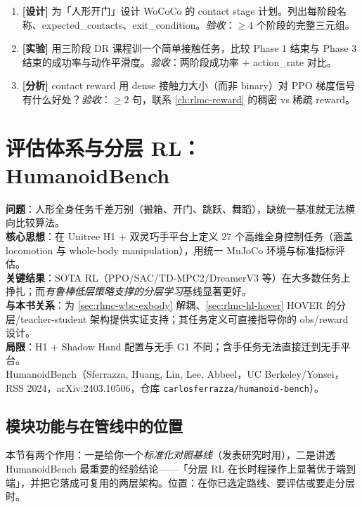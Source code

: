 \begin{practice}[本节动手]
\begin{enumerate}
  \item \textbf{[设计]} 为「人形开门」设计 WoCoCo 的 contact stage 计划。列出每阶段名称、expected\_contacts、exit\_condition。\emph{验收}：$\geq 4$ 个阶段的完整三元组。
  \item \textbf{[实验]} 用三阶段 DR 课程训一个简单接触任务，比较 Phase 1 结束与 Phase 3 结束的成功率与动作平滑度。\emph{验收}：两阶段成功率 $+$ action\_rate 对比。
  \item \textbf{[分析]} contact reward 用 dense 接触力大小（而非 binary）对 PPO 梯度信号有什么好处？\emph{验收}：$\geq 2$ 句，联系 \cref{ch:rlmc-reward} 的稠密 vs 稀疏 reward。
\end{enumerate}
\end{practice}

\section{评估体系与分层 RL：HumanoidBench}\label{sec:rlmc-wbc-bench}

\begin{paper}\label{paper:rlmc-wbc-bench}
\textbf{问题}：人形全身任务千差万别（搬箱、开门、跳跃、舞蹈），缺统一基准就无法横向比较算法。\\
\textbf{核心思想}：在 Unitree H1 $+$ 双灵巧手平台上定义 $27$ 个高维全身控制任务（涵盖 locomotion 与 whole-body manipulation），用统一 MuJoCo 环境与标准指标评估。\\
\textbf{关键结果}：SOTA RL（PPO/SAC/TD-MPC2/DreamerV3 等）在大多数任务上挣扎；而\emph{有鲁棒低层策略支撑的分层学习}基线显著更好。\\
\textbf{与本书关系}：为 \cref{sec:rlmc-wbc-exbody} 解耦、\cref{sec:rlmc-hl-hover} HOVER 的分层/teacher-student 架构提供实证支持；其任务定义可直接指导你的 obs/reward 设计。\\
\textbf{局限}：H1 $+$ Shadow Hand 配置与无手 G1 不同；含手任务无法直接迁到无手平台。\\
HumanoidBench（Sferrazza, Huang, Lin, Lee, Abbeel，UC Berkeley/Yonsei，RSS 2024，arXiv:2403.10506，仓库 \texttt{carlosferrazza/humanoid-bench}）\cite{sferrazza2024humanoidbench}。
\end{paper}

\subsection{模块功能与在管线中的位置}
本节有两个作用：一是给你一个\emph{标准化对照基线}（发表研究时用），二是讲透 HumanoidBench 最重要的经验结论——「分层 RL 在长时程操作上显著优于端到端」，并把它落成可复用的两层架构。位置：在你已选定路线、要评估或要走分层时。

